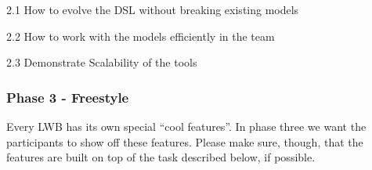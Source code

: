\begin{compactitem}
    \item 2.1 How to evolve the DSL without breaking existing models
    \item 2.2 How to work with the models efficiently in the team
    \item 2.3 Demonstrate Scalability of the tools
\end{compactitem}

\subsubsection{Phase 3 - Freestyle}

Every LWB has its own special ``cool features''. In phase three we want the
participants to show off these features. Please make sure, though, that the
features are built on top of the task described below, if possible.
